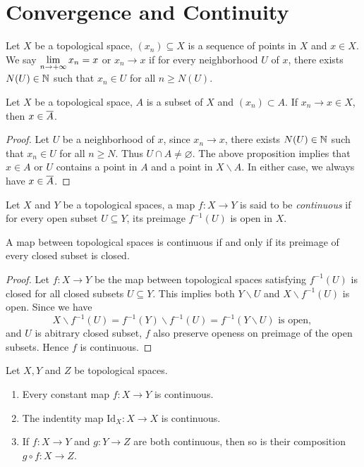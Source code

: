 \section{Convergence and Continuity}
\begin{definition}[Convergence]
    Let $X$ be a topological space, $(x_n) \subseteq X$ is a sequence of points in $X$ and $x \in X$. We say $\displaystyle \lim_{n \to +\infty} x_n = x$ or $x_n \to x$ if for every neighborhood $U$ of $x$, there exists $N(U) \in \mathbb{N}$ such that $x_n \in U$ for all $n \geq N(U)$.
\end{definition}
\begin{proposition}
    Let $X$ be a topological space, $A$ is a subset of $X$ and $(x_n) \subset A$. If $x_n \to x \in X$, then $x \in \overline{A}$.
\end{proposition}
\begin{proof}
    Let $U$ be a neighborhood of $x$, since $x_n \to x$, there exists $N(U) \in \mathbb{N}$ such that $x_n \in U$ for all $n \geq N$. Thus $U \cap A \neq \varnothing$. The above proposition implies that $x \in A$ or $U$ contains a point in $A$ and a point in $X \backslash A$. In either case, we always have $x \in \overline{A}$.
\end{proof}
\begin{definition}[Continuity]
    Let $X$ and $Y$ be a topological spaces, a map $f: X \to Y$ is said to be \textit{continuous} if for every open subset $U \subseteq Y$, its preimage $f^{-1}(U)$ is open in $X$.
\end{definition}
\begin{proposition}
    A map between topological spaces is continuous if and only if its preimage of every closed subset is closed.
\end{proposition}
\begin{proof}
    Let $f: X \to Y$ be the map between topological spaces satisfying $f^{-1}(U)$ is closed for all closed subsets $U \subseteq Y$. This implies both $Y \backslash U$ and $X \backslash f^{-1}(U)$ is open. Since we have 
    \[
        X \backslash f^{-1}(U) = f^{-1}(Y) \backslash f^{-1}(U) = f^{-1}(Y \backslash U) \text{ is open, }
    \]
    and $U$ is abitrary closed subset, $f$ also preserve openess on preimage of the open subsets. Hence $f$ is continuous.
\end{proof}
\begin{proposition}
    Let $X,Y$ and $Z$ be topological spaces.
    \begin{enumerate}
        \item Every constant map $f: X \to Y$ is continuous.
        \item The indentity map $\mathrm{Id}_X:X \to X$ is continuous.
        \item If $f: X \to Y$ and $g: Y \to Z$ are both continuous, then so is their composition $g \circ f: X \to Z$.
    \end{enumerate}
\end{proposition}
